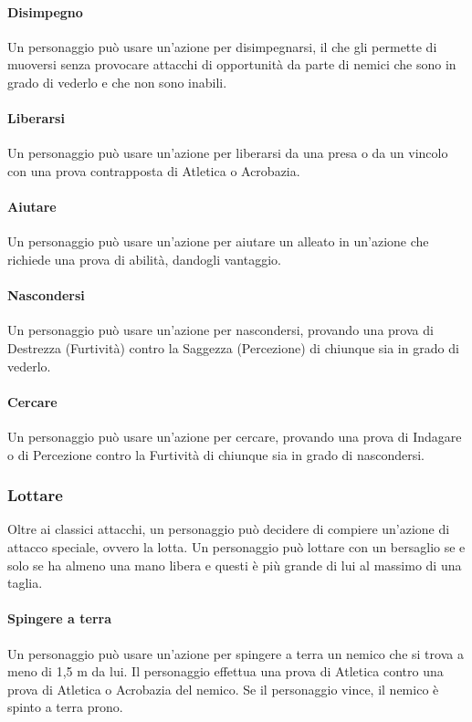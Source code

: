 \paragraph{Disimpegno}
Un personaggio può usare un'azione per disimpegnarsi, il che gli permette di muoversi senza provocare attacchi di opportunità da parte di nemici che sono in grado di vederlo e che non sono inabili.\\
\paragraph{Liberarsi}
Un personaggio può usare un'azione per liberarsi da una presa o da un vincolo con una prova contrapposta di Atletica o Acrobazia.\\
\paragraph{Aiutare}
Un personaggio può usare un'azione per aiutare un alleato in un'azione che richiede una prova di abilità, dandogli vantaggio.\\
\paragraph{Nascondersi}
Un personaggio può usare un'azione per nascondersi, provando una prova di Destrezza (Furtività) contro la Saggezza (Percezione) di chiunque sia in grado di vederlo.\\
\paragraph{Cercare}
Un personaggio può usare un'azione per cercare, provando una prova di Indagare o di Percezione contro la Furtività di chiunque sia in grado di nascondersi.\\

\subsubsection{Lottare}
Oltre ai classici attacchi, un personaggio può decidere di compiere un'azione di attacco speciale, ovvero la lotta. Un personaggio può lottare con un bersaglio se e solo se ha almeno una mano libera e questi è più grande di lui al massimo di una taglia.\\
\paragraph{Spingere a terra}
Un personaggio può usare un'azione per spingere a terra un nemico che si trova a meno di 1,5 m da lui. Il personaggio effettua una prova di Atletica contro una prova di Atletica o Acrobazia del nemico. Se il personaggio vince, il nemico è spinto a terra prono.\\
